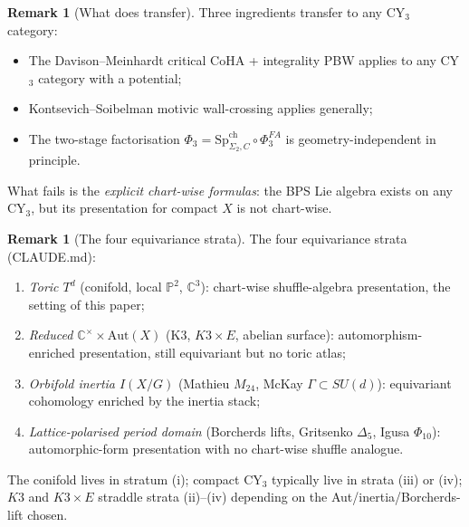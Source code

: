 \documentclass[11pt]{amsart}
\theoremstyle{definition}
\newtheorem{remark}[theorem]{Remark}
\providecommand{\bC}{\mathbb{C}}
\providecommand{\bP}{\mathbb{P}}
\begin{document}
\begin{remark}[What does transfer]
\label{rem:compact-transfer}
Three ingredients transfer to any CY$_3$ category:
\begin{itemize}[leftmargin=2em]
\item The Davison--Meinhardt critical CoHA + integrality PBW applies to
  any CY$_3$ category with a potential;
\item Kontsevich--Soibelman motivic wall-crossing applies generally;
\item The two-stage factorisation $\Phi_3 = \mathrm{Sp}^{\mathrm{ch}}_{\Sigma_2, C}
  \circ \Phi^{FA}_3$ is geometry-independent in principle.
\end{itemize}
What fails is the \emph{explicit chart-wise formulas}: the BPS Lie
algebra exists on any CY$_3$, but its presentation for compact $X$ is
not chart-wise.
\end{remark}

\begin{remark}[The four equivariance strata]
\label{rem:four-strata}
The four equivariance strata (CLAUDE.md):
\begin{enumerate}[label=\emph{(\roman*)}, leftmargin=2em]
\item \emph{Toric $T^d$} (conifold, local $\bP^2$, $\bC^3$): chart-wise
  shuffle-algebra presentation, the setting of this paper;
\item \emph{Reduced $\bC^\times \times \mathrm{Aut}(X)$} (K3,
  $K3 \times E$, abelian surface): automorphism-enriched presentation,
  still equivariant but no toric atlas;
\item \emph{Orbifold inertia $I(X/G)$} (Mathieu $M_{24}$, McKay
  $\Gamma \subset SU(d)$): equivariant cohomology enriched by the
  inertia stack;
\item \emph{Lattice-polarised period domain} (Borcherds lifts,
  Gritsenko $\Delta_5$, Igusa $\Phi_{10}$): automorphic-form
  presentation with no chart-wise shuffle analogue.
\end{enumerate}
The conifold lives in stratum (i); compact CY$_3$ typically live in
strata (iii) or (iv); $K3$ and $K3 \times E$ straddle strata (ii)--(iv)
depending on the Aut/inertia/Borcherds-lift chosen.
\end{remark}
\end{document}
